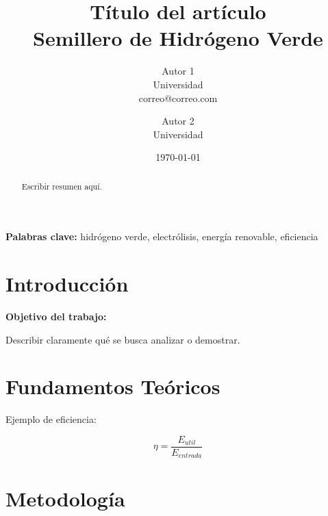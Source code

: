 \documentclass[11pt,a4paper]{article}
\title{
Título del artículo \\
\large Semillero de Hidrógeno Verde
}
\author{
Autor 1\\
Universidad\\
correo@correo.com
\and
Autor 2\\
Universidad
}
\date{\today}
\begin{document}
\maketitle

\begin{abstract}


Escribir resumen aquí.

\end{abstract}

\textbf{Palabras clave:} hidrógeno verde, electrólisis, energía renovable, eficiencia

\section{Introducción}


\textbf{Objetivo del trabajo:}

Describir claramente qué se busca analizar o demostrar.

\section{Fundamentos Teóricos}


Ejemplo de eficiencia:

\begin{equation}
\eta = \frac{E_{util}}{E_{entrada}}
\end{equation}


\section{Metodología}

\end{document}
